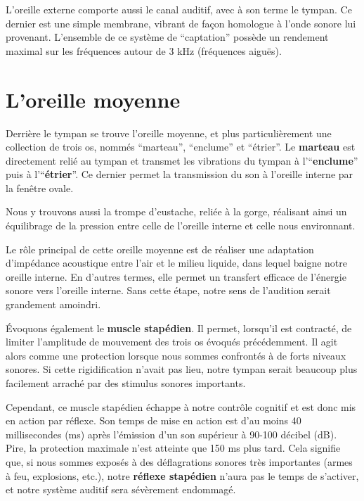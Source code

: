 \documentclass[
  letterpaper,
  DIV=11,
  numbers=noendperiod]{scrreprt}
\begin{document}
L'oreille externe comporte aussi le canal auditif, avec à son terme le
tympan. Ce dernier est une simple membrane, vibrant de façon homologue à
l'onde sonore lui provenant. L'ensemble de ce système de ``captation''
possède un rendement maximal sur les fréquences autour de 3 kHz
(fréquences aiguës).

\hypertarget{loreille-moyenne}{%
\section{L'oreille moyenne}\label{loreille-moyenne}}

Derrière le tympan se trouve l'oreille moyenne, et plus particulièrement
une collection de trois os, nommés ``marteau'', ``enclume'' et
``étrier''. Le \textbf{marteau} est directement relié au tympan et
transmet les vibrations du tympan à l'``\textbf{enclume}'' puis à
l'``\textbf{étrier}''. Ce dernier permet la transmission du son à
l'oreille interne par la fenêtre ovale.

Nous y trouvons aussi la trompe d'eustache, reliée à la gorge, réalisant
ainsi un équilibrage de la pression entre celle de l'oreille interne et
celle nous environnant.

Le rôle principal de cette oreille moyenne est de réaliser une
adaptation d'impédance acoustique entre l'air et le milieu liquide, dans
lequel baigne notre oreille interne. En d'autres termes, elle permet un
transfert efficace de l'énergie sonore vers l'oreille interne. Sans
cette étape, notre sens de l'audition serait grandement amoindri.

Évoquons également le \textbf{muscle stapédien}. Il permet, lorsqu'il
est contracté, de limiter l'amplitude de mouvement des trois os évoqués
précédemment. Il agit alors comme une protection lorsque nous sommes
confrontés à de forts niveaux sonores. Si cette rigidification n'avait
pas lieu, notre tympan serait beaucoup plus facilement arraché par des
stimulus sonores importants.

Cependant, ce muscle stapédien échappe à notre contrôle cognitif et est
donc mis en action par réflexe. Son temps de mise en action est d'au
moins 40 millisecondes (ms) après l'émission d'un son supérieur à 90-100
décibel (dB). Pire, la protection maximale n'est atteinte que 150 ms
plus tard. Cela signifie que, si nous sommes exposés à des déflagrations
sonores très importantes (armes à feu, explosions, etc.), notre
\textbf{réflexe stapédien} n'aura pas le temps de s'activer, et notre
système auditif sera sévèrement endommagé.
\end{document}
